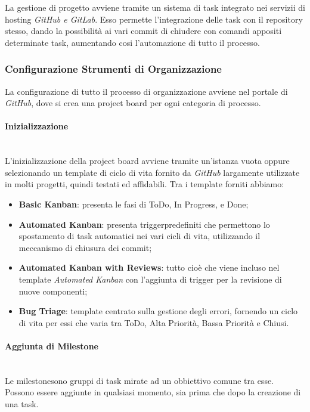 La gestione di progetto avviene tramite un sistema di task integrato nei servizii di hosting \textit{GitHub e GitLab}. 
Esso permette l'integrazione delle task con il repository stesso, dando la possibilità ai vari commit di chiudere con comandi appositi determinate task, aumentando cosi l'automazione di tutto il processo. 

\subsubsection{Configurazione Strumenti di Organizzazione}
	La configurazione di tutto il processo di organizzazione avviene nel portale di \textit{GitHub}, dove si crea una project board per ogni categoria di processo. 	

\paragraph{Inizializzazione} \-\\
 L'inizializzazione della project board avviene tramite un'istanza vuota oppure selezionando un template di ciclo di vita fornito da \textit{GitHub} largamente utilizzate in molti progetti, quindi testati ed affidabili. Tra i template forniti abbiamo: 

\begin{itemize}
		\item \textbf{Basic Kanban}: presenta le fasi di ToDo, In Progress, e Done; 
		\item \textbf{Automated Kanban}: presenta trigger\glossario predefiniti che permettono lo spostamento di task
		 automatici nei vari cicli di vita, utilizzando il meccanismo di chiusura dei commit;
		\item \textbf{Automated Kanban with Reviews}: tutto cioè che viene incluso nel template \textit{Automated Kanban} con l'aggiunta di trigger per la revisione di nuove componenti; 
		\item \textbf{Bug Triage}: template centrato sulla gestione degli errori, fornendo un ciclo di vita per essi che varia tra ToDo, Alta Priorità, Bassa Priorità e Chiusi. 
\end{itemize}
	  	
\paragraph{Aggiunta di Milestone} \-\\
	Le milestone\glossario sono gruppi di task mirate ad un obbiettivo comune tra esse.
	Possono essere aggiunte in qualsiasi momento, sia prima che dopo la creazione di una task.

